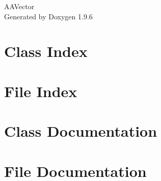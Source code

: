 \documentclass[twoside]{book}
\newcommand{\+}{\discretionary{\mbox{\scriptsize$\hookleftarrow$}}{}{}}
\newcommand{\clearemptydoublepage}{%
    \newpage{\pagestyle{empty}\cleardoublepage}%
  }
\begin{document}
  \raggedbottom
    \hypersetup{pageanchor=false,
                bookmarksnumbered=true,
                pdfencoding=unicode
               }
  \begin{titlepage}
  \vspace*{7cm}
  \begin{center}%
  {\Large AAVector}\\
  \vspace*{1cm}
  {\large Generated by Doxygen 1.9.6}\\
  \end{center}
  \end{titlepage}
  \clearemptydoublepage
  \tableofcontents
  \clearemptydoublepage
  \hypersetup{pageanchor=true}
\chapter{Class Index}

\chapter{File Index}

\chapter{Class Documentation}

\chapter{File Documentation}




  \backmatter
  \newpage
  \clearemptydoublepage
  \printindex
\end{document}
